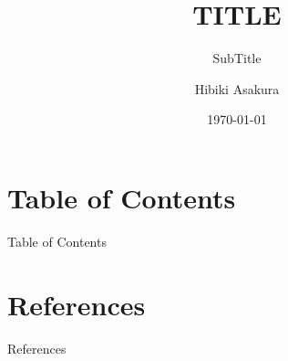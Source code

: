 \documentclass[unicode,14pt]{beamer}%
\title[short title]{TITLE}
\subtitle{SubTitle}
\author[H.\,Asakura]{Hibiki Asakura}
\institute[Kyoto]{Kyoto University}
\date{\today}
\begin{document}
\begin{frame}[noframenumbering]
  \titlepage
\end{frame}

\section*{Table of Contents}
\begin{frame}{Table of Contents}
  \tableofcontents[hideallsubsections]
\end{frame}




\section*{References}

\begin{frame}{References}
  
\end{frame}

\beginbackup

\backupend
\end{document}
